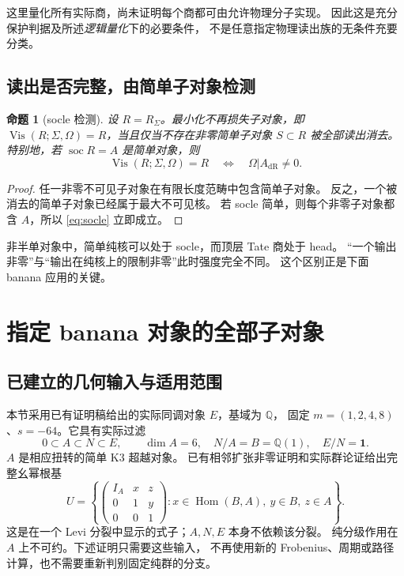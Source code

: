 \documentclass[11pt,a4paper]{ctexart}
\theoremstyle{cnplain}
\newtheorem{proposition}[theorem]{命题}
\theoremstyle{definition}
\theoremstyle{remark}
\newcommand{\Q}{\mathbb Q}
\newcommand{\dR}{\mathrm{dR}}
\newcommand{\Hom}{\operatorname{Hom}}
\newcommand{\Vis}{\operatorname{Vis}}
\newcommand{\soc}{\operatorname{soc}}
\begin{document}
这里量化所有实际商，尚未证明每个商都可由允许物理分子实现。
因此这是充分保护判据及所述\emph{逻辑量化}下的必要条件，
不是任意指定物理读出族的无条件充要分类。

\subsection{读出是否完整，由简单子对象检测}
\begin{proposition}[socle 检测]\label{prop:socle}
设 $R=R_\Sigma$。最小化不再损失子对象，即
$\Vis(R;\Sigma,\Omega)=R$，当且仅当不存在非零简单子对象
$S\subset R$ 被全部读出消去。
特别地，若 $\soc R=A$ 是简单对象，则
\begin{equation}\label{eq:socle}
 \Vis(R;\Sigma,\Omega)=R
 \quad\Longleftrightarrow\quad \Omega|A_{\dR}\ne0.
\end{equation}
\end{proposition}
\begin{proof}
任一非零不可见子对象在有限长度范畴中包含简单子对象。
反之，一个被消去的简单子对象已经属于最大不可见核。
若 socle 简单，则每个非零子对象都含 $A$，所以 \eqref{eq:socle} 立即成立。
\end{proof}

非半单对象中，简单纯核可以处于 socle，而顶层 Tate 商处于 head。
``一个输出非零''与``输出在纯核上的限制非零''此时强度完全不同。
这个区别正是下面 banana 应用的关键。

\section{指定 banana 对象的全部子对象}
\subsection{已建立的几何输入与适用范围}
本节采用已有证明稿给出的实际同调对象 $E$，基域为 $\Q$，
固定 $m=(1,2,4,8)$、$s=-64$。它具有实际过滤
\begin{equation}\label{eq:banana}
 0\subset A\subset N\subset E,
 \qquad \dim A=6,\quad N/A=B=\Q(1),\quad E/N=\mathbf1.
\end{equation}
$A$ 是相应扭转的简单 K3 超越对象。
已有相邻扩张非零证明和实际群论证给出完整幺幂根基
\begin{equation}\label{eq:U}
 U=\left\{
 \begin{pmatrix}I_A&x&z\\0&1&y\\0&0&1\end{pmatrix}
 :x\in\Hom(B,A),\ y\in B,\ z\in A\right\}.
\end{equation}
这是在一个 Levi 分裂中显示的式子；$A,N,E$ 本身不依赖该分裂。
纯分级作用在 $A$ 上不可约。下述证明只需要这些输入，
不再使用新的 Frobenius、周期或路径计算，也不需要重新判别固定纯群的分支。
\end{document}
